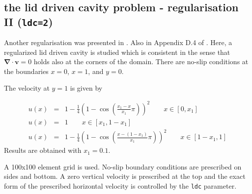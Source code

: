 \subsection{the lid driven cavity problem - regularisation II ({\tt ldc=2})}

Another regularisation was presented in \cite{dejn16}. Also in Appendix D.4 of \cite{john16}. 
Here, a regularized lid driven cavity is studied which is consistent in the sense that 
${\bm \nabla}\cdot{\bm v}=0$ 
holds also at the corners of the domain.
There are no-slip conditions at the boundaries $x=0$, $x=1$, and $y=0$. 

The velocity at $y=1$ is given by

\begin{eqnarray}
u(x) &=& 1-\frac{1}{4}\left( 1-\cos (\frac{x_1-x}{x_1}\pi)  \right)^2   \quad\quad x\in[0,x_1] \nonumber\\
u(x) &=& 1 \quad\quad x\in[x_1,1-x_1] \nonumber\\
u(x) &=& 1-\frac{1}{4}\left( 1-\cos (\frac{x-(1-x_1)}{x_1}\pi)  \right)^2   \quad\quad x\in[1-x_1,1]
\end{eqnarray}
Results are obtained with $x_1=0.1$.

\begin{center}
\end{center}



\newpage
A 100x100 element grid is used. No-slip boundary conditions are prescribed on sides and
bottom. A zero vertical velocity is prescribed at the top and the exact form of the 
prescribed horizontal velocity is controlled by the {\tt ldc} parameter.

